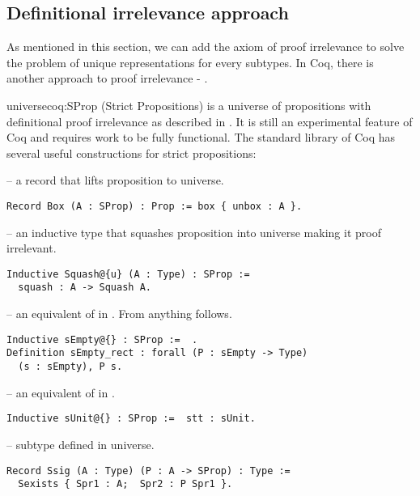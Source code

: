 \subsection{Definitional irrelevance approach}
As mentioned in this section, we can add the axiom of proof irrelevance to solve the problem of unique representations for every subtypes. In Coq, there is another approach to proof irrelevance - .
\begin{coq}[]{ universe}{coq:SProp}
 (Strict Propositions) is a universe of propositions with definitional proof irrelevance as described in \cite{BasesOfSProp}. It is still an experimental feature\cite{coqDoc} of Coq and requires work to be fully functional. The standard library of Coq has several useful constructions for strict propositions:
\begin{description}
    \item {} -- a record that lifts  proposition to  universe.
    \begin{verbatim}
Record Box (A : SProp) : Prop := box { unbox : A }.
    \end{verbatim}
    \item {} -- an inductive type that squashes proposition into  universe making it proof irrelevant.
    \begin{verbatim}
Inductive Squash@{u} (A : Type) : SProp :=  
  squash : A -> Squash A.
    \end{verbatim}
    \item {} -- an equivalent of  in . From  anything follows.
    \begin{verbatim}
Inductive sEmpty@{} : SProp :=  .
Definition sEmpty_rect : forall (P : sEmpty -> Type) 
  (s : sEmpty), P s.
    \end{verbatim}
    \item {} -- an equivalent of  in .
    \begin{verbatim}
Inductive sUnit@{} : SProp :=  stt : sUnit.
    \end{verbatim}
    \item {} -- subtype defined in  universe.
    \begin{verbatim}
Record Ssig (A : Type) (P : A -> SProp) : Type :=
  Sexists { Spr1 : A;  Spr2 : P Spr1 }.
    \end{verbatim}
\end{description}
\end{coq}
